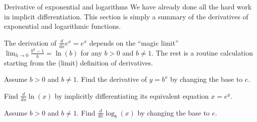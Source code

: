 \documentclass[../main.tex]{subfiles}
\begin{document}
\begin{lesson}{Derivative of exponential and logarithms}
  We have already done all the hard work in implicit differentiation.  This section is simply a summary of the derivatives of exponential and logarithmic functions. 

  The derivation of \(\frac{d}{dx} e^{x} = e^{x}\) depends on the ``magic limit'' \(\lim_{h \to 0} \frac{b^{h} - 1}{h} = \ln(b)\) for any \(b > 0\) and \(b \ne 1\). The rest is a routine calculation starting from the (limit) definition of derivatives. 

  \begin{example}
    Assume \(b > 0\) and \(b \ne 1\). Find the derivative of \(y = b^{x}\) by changing the base to \(e\).

  \end{example}

  \begin{example}
    Find \(\frac{d}{dx}\ln(x)\) by implicitly differentiating its equivalent equation \(x = e^{y}\).

  \end{example}

  \begin{example}
    Assume \(b > 0\) and \(b \ne 1\). Find \(\frac{d}{dx} \log_{b}(x)\) by changing the base to \(e\).

  \end{example}
\end{lesson}
\end{document}
